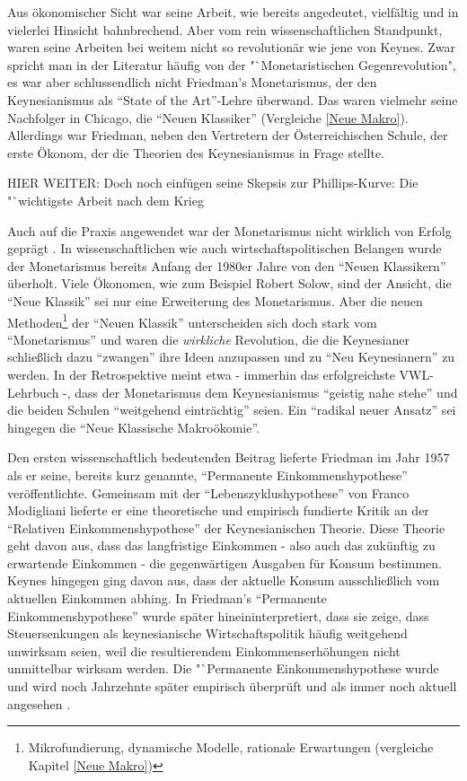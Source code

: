Aus ökonomischer Sicht war seine Arbeit, wie bereits angedeutet, vielfältig und in vielerlei Hinsicht bahnbrechend. Aber vom rein wissenschaftlichen Standpunkt, waren seine Arbeiten bei weitem nicht so revolutionär wie jene von Keynes. Zwar spricht man in der Literatur häufig von der "`Monetaristischen Gegenrevolution", es war aber schlussendlich nicht Friedman's Monetarismus, der den Keynesianismus als "`State of the Art"'-Lehre überwand. Das waren vielmehr seine Nachfolger in Chicago, die "`Neuen Klassiker"' (Vergleiche \ref{Neue Makro}). Allerdings war Friedman, neben den Vertretern der Österreichischen Schule, der erste Ökonom, der die Theorien des Keynesianismus in Frage stellte.

HIER WEITER: Doch noch einfügen seine Skepsis zur Phillips-Kurve: Die "`wichtigste Arbeit nach dem Krieg \textcite[S. 160]{Snowdon2005}


Auch auf die Praxis angewendet war der Monetarismus nicht wirklich von Erfolg geprägt \parencite[S. 709]{Samuelson1998}. In wissenschaftlichen wie auch wirtschaftspolitischen Belangen wurde der Monetarismus bereits Anfang der 1980er Jahre von den "`Neuen Klassikern"' überholt. Viele Ökonomen, wie zum Beispiel Robert Solow, sind der Ansicht, die "`Neue Klassik"' sei nur eine Erweiterung des Monetarismus\parencite[S.342]{Warsh}. Aber die neuen Methoden\footnote{Mikrofundierung, dynamische Modelle, rationale Erwartungen (vergleiche Kapitel \ref{Neue Makro})} der "`Neuen Klassik"' unterscheiden sich doch stark vom "`Monetarismus"' und waren die \textit{wirkliche} Revolution, die die Keynesianer schließlich dazu "`zwangen"' ihre Ideen anzupassen und zu "`Neu Keynesianern"' zu werden. In der Retrospektive meint etwa \textcite[S. 697]{Samuelson1998} - immerhin das erfolgreichste VWL-Lehrbuch -, dass der Monetarismus dem Keynesianismus "`geistig nahe stehe"' und die beiden Schulen "`weitgehend einträchtig"' \parencite[S. 702]{Samuelson1998} seien. Ein "`radikal neuer Ansatz"'\parencite[S. 704]{Samuelson1998} sei hingegen die "`Neue Klassische Makroökomie"'.

Den ersten wissenschaftlich bedeutenden Beitrag lieferte Friedman im Jahr 1957 \parencite{Friedman1957} als er seine, bereits kurz genannte, "`Permanente Einkommenshypothese"' veröffentlichte. Gemeinsam mit der "`Lebenszyklushypothese"' \parencite{Modigliani1954} von Franco Modigliani lieferte er eine theoretische und empirisch fundierte Kritik an der "`Relativen Einkommenshypothese"' der Keynesianischen Theorie. Diese Theorie geht davon aus, dass das langfristige Einkommen - also auch das zukünftig zu erwartende Einkommen - die gegenwärtigen Ausgaben für Konsum bestimmen. Keynes hingegen ging davon aus, dass der aktuelle Konsum ausschließlich vom aktuellen Einkommen abhing. In Friedman's "`Permanente Einkommenshypothese"' wurde später hineininterpretiert, dass sie zeige, dass Steuersenkungen als keynesianische Wirtschaftspolitik häufig weitgehend unwirksam seien, weil die resultierendem Einkommenserhöhungen nicht unmittelbar wirksam werden. Die "`Permanente Einkommenshypothese wurde und wird noch Jahrzehnte später empirisch überprüft und als immer noch aktuell angesehen \parencite{Bernanke1984, Mankiw1985}.  

